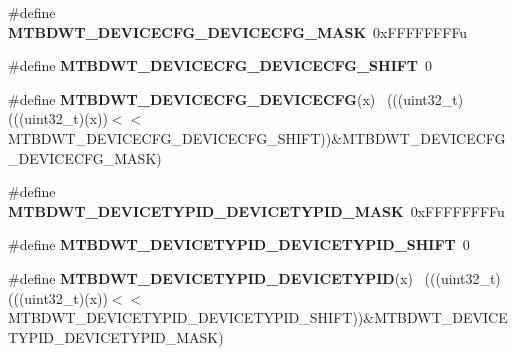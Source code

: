 \begin{DoxyCompactItemize}
\item 
\hypertarget{group___m_t_b_d_w_t___register___masks_ga90daa5cb85d4d39b819f5c9bc1b20546}{}\#define {\bfseries M\+T\+B\+D\+W\+T\+\_\+\+D\+E\+V\+I\+C\+E\+C\+F\+G\+\_\+\+D\+E\+V\+I\+C\+E\+C\+F\+G\+\_\+\+M\+A\+S\+K}~0x\+F\+F\+F\+F\+F\+F\+F\+Fu\label{group___m_t_b_d_w_t___register___masks_ga90daa5cb85d4d39b819f5c9bc1b20546}

\item 
\hypertarget{group___m_t_b_d_w_t___register___masks_ga2194cb4b21ad650bf3957d3f95f4dbbb}{}\#define {\bfseries M\+T\+B\+D\+W\+T\+\_\+\+D\+E\+V\+I\+C\+E\+C\+F\+G\+\_\+\+D\+E\+V\+I\+C\+E\+C\+F\+G\+\_\+\+S\+H\+I\+F\+T}~0\label{group___m_t_b_d_w_t___register___masks_ga2194cb4b21ad650bf3957d3f95f4dbbb}

\item 
\hypertarget{group___m_t_b_d_w_t___register___masks_ga150a8008c2ca6200e701bcd7f3aa6a5c}{}\#define {\bfseries M\+T\+B\+D\+W\+T\+\_\+\+D\+E\+V\+I\+C\+E\+C\+F\+G\+\_\+\+D\+E\+V\+I\+C\+E\+C\+F\+G}(x)                    ~(((uint32\+\_\+t)(((uint32\+\_\+t)(x))$<$$<$M\+T\+B\+D\+W\+T\+\_\+\+D\+E\+V\+I\+C\+E\+C\+F\+G\+\_\+\+D\+E\+V\+I\+C\+E\+C\+F\+G\+\_\+\+S\+H\+I\+F\+T))\&M\+T\+B\+D\+W\+T\+\_\+\+D\+E\+V\+I\+C\+E\+C\+F\+G\+\_\+\+D\+E\+V\+I\+C\+E\+C\+F\+G\+\_\+\+M\+A\+S\+K)\label{group___m_t_b_d_w_t___register___masks_ga150a8008c2ca6200e701bcd7f3aa6a5c}

\item 
\hypertarget{group___m_t_b_d_w_t___register___masks_ga6986bcf237d6ff96e25d6458355ef4b8}{}\#define {\bfseries M\+T\+B\+D\+W\+T\+\_\+\+D\+E\+V\+I\+C\+E\+T\+Y\+P\+I\+D\+\_\+\+D\+E\+V\+I\+C\+E\+T\+Y\+P\+I\+D\+\_\+\+M\+A\+S\+K}~0x\+F\+F\+F\+F\+F\+F\+F\+Fu\label{group___m_t_b_d_w_t___register___masks_ga6986bcf237d6ff96e25d6458355ef4b8}

\item 
\hypertarget{group___m_t_b_d_w_t___register___masks_ga8caaff8277e4bdaee5735e22d6eb6e7c}{}\#define {\bfseries M\+T\+B\+D\+W\+T\+\_\+\+D\+E\+V\+I\+C\+E\+T\+Y\+P\+I\+D\+\_\+\+D\+E\+V\+I\+C\+E\+T\+Y\+P\+I\+D\+\_\+\+S\+H\+I\+F\+T}~0\label{group___m_t_b_d_w_t___register___masks_ga8caaff8277e4bdaee5735e22d6eb6e7c}

\item 
\hypertarget{group___m_t_b_d_w_t___register___masks_ga1fc0af455274786a5c7eaca60cca8792}{}\#define {\bfseries M\+T\+B\+D\+W\+T\+\_\+\+D\+E\+V\+I\+C\+E\+T\+Y\+P\+I\+D\+\_\+\+D\+E\+V\+I\+C\+E\+T\+Y\+P\+I\+D}(x)            ~(((uint32\+\_\+t)(((uint32\+\_\+t)(x))$<$$<$M\+T\+B\+D\+W\+T\+\_\+\+D\+E\+V\+I\+C\+E\+T\+Y\+P\+I\+D\+\_\+\+D\+E\+V\+I\+C\+E\+T\+Y\+P\+I\+D\+\_\+\+S\+H\+I\+F\+T))\&M\+T\+B\+D\+W\+T\+\_\+\+D\+E\+V\+I\+C\+E\+T\+Y\+P\+I\+D\+\_\+\+D\+E\+V\+I\+C\+E\+T\+Y\+P\+I\+D\+\_\+\+M\+A\+S\+K)\label{group___m_t_b_d_w_t___register___masks_ga1fc0af455274786a5c7eaca60cca8792}


\end{DoxyCompactItemize}
